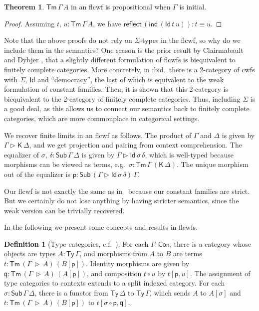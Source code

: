 \documentclass[12pt,a4paper,twoside,openany]{book}
\theoremstyle{remark}
\theoremstyle{definition}
\newtheorem{mydefinition}{Definition}
\theoremstyle{theorem}
\newtheorem{theorem}{Theorem}
\newcommand{\ms}[1]{\mathsf{#1}}
\newcommand{\reflect}{\mathsf{reflect}}
\newcommand{\Con}{\mathsf{Con}}
\newcommand{\Sub}{\mathsf{Sub}}
\newcommand{\Tm}{\mathsf{Tm}}
\newcommand{\Ty}{\mathsf{Ty}}
\newcommand{\Id}{\mathsf{Id}}
\newcommand{\ext}{\triangleright}
\newcommand{\p}{\mathsf{p}}
\newcommand{\q}{\mathsf{q}}
\newcommand{\K}{\mathsf{K}}
\begin{document}
\begin{theorem}
\label{thm:flcwf-term-uniqueness}
$\Tm\,\Gamma\,A$ in an flcwf is propositional when $\Gamma$ is initial.
\end{theorem}
\begin{proof} Assuming $t,\,u : \Tm\,\Gamma\,A$, we have
$\reflect\,(\ms{ind}\,(\Id\,t\,u)) : t \equiv u$.
\end{proof}

Note that the above proofs do not rely on $\Sigma$-types in the flcwf, so why
do we include them in the semantics? One reason is the prior result by
Clairmabault and Dybjer \cite{clairambault2014biequivalence}, that a slightly
different formulation of flcwfs is biequivalent to finitely complete
categories. More concretely, in ibid.\ there is a 2-category of cwfs with
$\Sigma$, $\Id$ and ``democracy'', the last of which is equivalent to the weak
formulation of constant families. Then, it is shown that this 2-category is
biequivalent to the 2-category of finitely complete categories. Thus, including
$\Sigma$ is a good deal, as this allows us to connect our semantics back to
finitely complete categories, which are more commonplace in categorical
settings.

We recover finite limits in an flcwf as follows. The product of $\Gamma$ and
$\Delta$ is given by $\Gamma \ext \K\,\Delta$, and we get projection and pairing
from context comprehension. The equalizer of $\sigma,\,\delta :
\Sub\,\Gamma\,\Delta$ is given by $\Gamma \ext \Id\,\sigma\,\delta$, which is
well-typed because morphisms can be viewed as terms, e.g.\ $\sigma :
\Tm\,\Gamma\,(\K\,\Delta)$. The unique morphism out of the equalizer is $\p :
\Sub\,(\Gamma \ext \Id\,\sigma\,\delta)\,\Gamma$.

Our flcwf is not exactly the same as in \cite{clairambault2014biequivalence}\,
because our constant families are strict. But we certainly do not lose anything
by having stricter semantics, since the weak version can be trivially
recovered.

In the following we present some concepts and results in flcwfs.

\begin{mydefinition}[Type categories, c.f.\ {\cite[Section 2.2]{clairambault2014biequivalence}}]
\label{def:type_categories} For each $\Gamma : \Con$, there is a category
whose objects are types $A : \Ty\,\Gamma$, and morphisms from $A$ to $B$ are
terms $t : \Tm\,(\Gamma\,\ext\,A)\,(B[\p])$. Identity morphisms are given by $\q
: \Tm\,(\Gamma\,\ext\,A)\,(A[\p])$, and composition $t \circ u$ by $t[\p,
  u]$. The assignment of type categories to contexts extends to a split indexed
category. For each $\sigma : \Sub\,\Gamma\,\Delta$, there is a functor from
$\Ty\,\Delta$ to $\Ty\,\Gamma$, which sends $A$ to $A[\sigma]$ and $t :
\Tm\,(\Gamma\,\ext\,A)\,(B[\p])$ to $t[\sigma\circ \p, \q]$.
\end{mydefinition}
\end{document}
